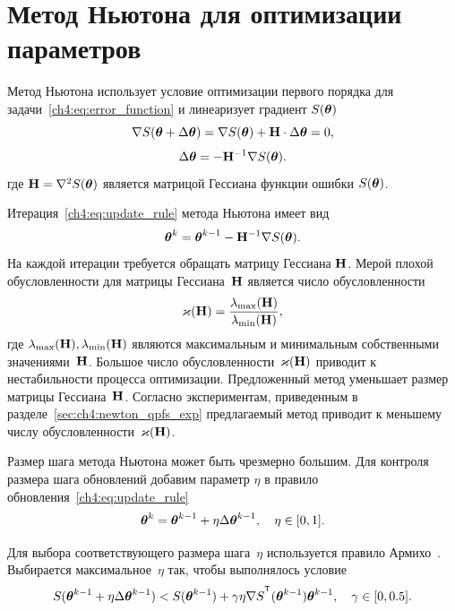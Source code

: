 \section{Метод Ньютона для оптимизации параметров}
\label{sec:ch4:newton_algorithm}

Метод Ньютона использует условие оптимизации первого порядка для задачи~\eqref{ch4:eq:error_function} и линеаризует градиент $S (\boldsymbol{\theta})$
\[
	\nabla S (\boldsymbol{\theta} + \Delta \boldsymbol{\theta}) = \nabla S(\boldsymbol{\theta}) + \mathbf{H} \cdot \Delta \boldsymbol{\theta} = 0,
\]
\[
	\Delta \boldsymbol{\theta} = - \mathbf{H}^{-1} \nabla S(\boldsymbol{\theta}).
\]
где $\mathbf{H} = \nabla^2 S(\boldsymbol{\theta})$ является матрицой Гессиана функции ошибки $S(\boldsymbol{\theta})$.

Итерация~\eqref{ch4:eq:update_rule} метода Ньютона имеет вид
\begin{equation}
	\boldsymbol{\theta}^k = \boldsymbol{\theta}^{k-1} - \mathbf{H}^{-1} \nabla S(\boldsymbol{\theta}).
	\label{ch4:eq:newton_step}
\end{equation}
На каждой итерации требуется обращать матрицу Гессиана $\mathbf{H}$.
Мерой плохой обусловленности для матрицы Гессиана~$\mathbf{H}$ является число обусловленности
\[
	\varkappa(\mathbf{H}) = \frac{\lambda_{\text{max}}(\mathbf{H})}{\lambda_{\text{min}}(\mathbf{H})},
\]
где $\lambda_{\text{max}}(\mathbf{H}), \lambda_{\text{min}}(\mathbf{H})$ являются максимальным и минимальным собственными значениями~$\mathbf{H}$. Большое число обусловленности~$\varkappa (\mathbf{H})$ приводит к нестабильности процесса оптимизации.
Предложенный метод уменьшает размер матрицы Гессиана~$\mathbf{H}$. Согласно экспериментам, приведенным в разделе~\ref{sec:ch4:newton_qpfs_exp} предлагаемый метод приводит к меньшему числу обусловленности~$\varkappa (\mathbf{H})$.

Размер шага метода Ньютона может быть чрезмерно большим. Для контроля размера шага обновлений добавим параметр $\eta$ в правило обновления~\eqref{ch4:eq:update_rule}
\[
	\boldsymbol{\theta}^k = \boldsymbol{\theta}^{k - 1} + \eta \Delta \boldsymbol{\theta}^{k - 1}, \quad \eta \in [0, 1].
\]

Для выбора соответствующего размера шага~$\eta$ используется правило Армихо~\cite{armijo1966minimization}. Выбирается максимальное~$\eta$ так, чтобы выполнялось условие
\[
	S(\btheta^{k - 1} + \eta \Delta \btheta^{k - 1}) < S(\btheta^{k - 1}) + \gamma \eta \nabla S^{\T}(\btheta^{k-1})\btheta^{k - 1}, \quad \gamma \in [0, 0.5].
\]

